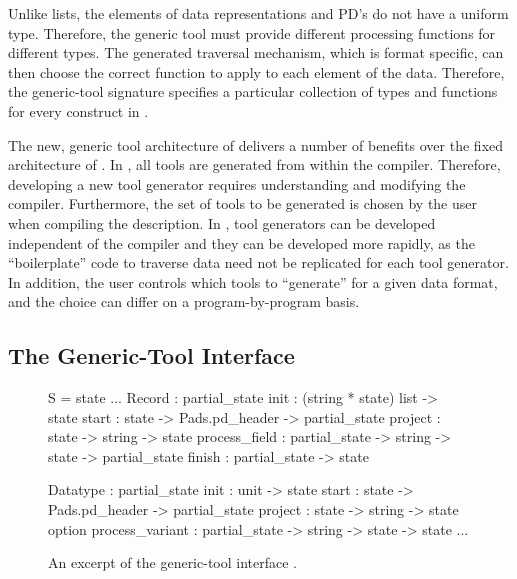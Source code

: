 Unlike lists, the elements of data representations and PD's do not
have a uniform type. Therefore, the generic tool must provide
different processing functions for different types. The generated
traversal mechanism, which is format specific, can then choose the
correct function to apply to each element of the data. Therefore, the
generic-tool signature specifies a particular collection of types and
functions for every construct in \padsml{}.

The new, generic tool architecture of \padsml{} delivers a number of
benefits over the fixed architecture of \padsc{}. In \padsc{}, all
tools are generated from within the compiler. Therefore, developing a
new tool generator requires understanding and modifying the compiler.
Furthermore, the set of tools to be generated is chosen by the user
when compiling the description.  In \padsml{}, tool generators can be
developed independent of the compiler and they can be developed more
rapidly, as the ``boilerplate'' code to traverse data need not be
replicated for each tool generator. In addition, the user controls
which tools to ``generate'' for a given data format, and the choice
can differ on a program-by-program basis.

\subsection{The Generic-Tool Interface}
\label{sec:gentool-interface}

\begin{figure}
\begin{code}\scriptsize
{}  S = 
   state
  ...
   Record : 
     partial_state
      init          : (string * state) list -> state
      start         : state -> Pads.pd_header 
                         -> partial_state
      project       : state -> string -> state
      process_field : partial_state -> string
                         -> state -> partial_state
      finish        : partial_state -> state

   Datatype : 
     partial_state
      init            : unit -> state
      start           : state -> Pads.pd_header 
                           -> partial_state
      project         : state -> string -> state option
      process_variant : partial_state -> string 
                           -> state -> state
   ...
\end{code}
\caption{An excerpt of the generic-tool interface .}
\label{fig:gentool-interface}
\end{figure}

